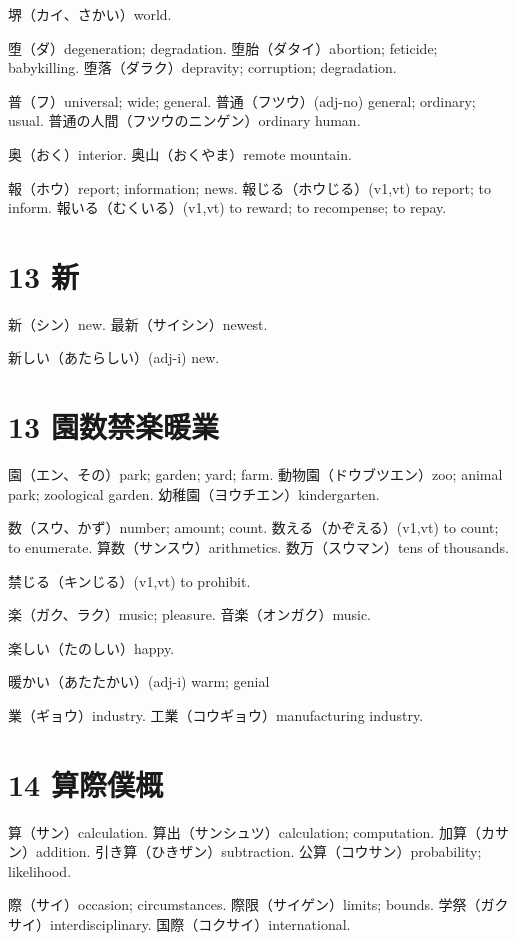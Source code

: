 堺（カイ、さかい）world.

堕（ダ）degeneration; degradation.
堕胎（ダタイ）abortion; feticide; babykilling.
堕落（ダラク）depravity; corruption; degradation.

普（フ）universal; wide; general.
普通（フツウ）(adj-no) general; ordinary; usual.
普通の人間（フツウのニンゲン）ordinary human.

奥（おく）interior.
奥山（おくやま）remote mountain.

報（ホウ）report; information; news.
報じる（ホウじる）(v1,vt) to report; to inform.
報いる（むくいる）(v1,vt) to reward; to recompense; to repay.

\section{13 新}

新（シン）new.
最新（サイシン）newest.

新しい（あたらしい）(adj-i) new.

\section{13 園数禁楽暖業}

園（エン、その）park; garden; yard; farm.
動物園（ドウブツエン）zoo; animal park; zoological garden.
幼稚園（ヨウチエン）kindergarten.

数（スウ、かず）number; amount; count.
数える（かぞえる）(v1,vt) to count; to enumerate.
算数（サンスウ）arithmetics.
数万（スウマン）tens of thousands.

禁じる（キンじる）(v1,vt) to prohibit.

楽（ガク、ラク）music; pleasure.
音楽（オンガク）music.

楽しい（たのしい）happy.

暖かい（あたたかい）(adj-i) warm; genial

業（ギョウ）industry.
工業（コウギョウ）manufacturing industry.

\section{14 算際僕概}

算（サン）calculation.
算出（サンシュツ）calculation; computation.
加算（カサン）addition.
引き算（ひきザン）subtraction.
公算（コウサン）probability; likelihood.

際（サイ）occasion; circumstances.
際限（サイゲン）limits; bounds.
学祭（ガクサイ）interdisciplinary.
国際（コクサイ）international.

